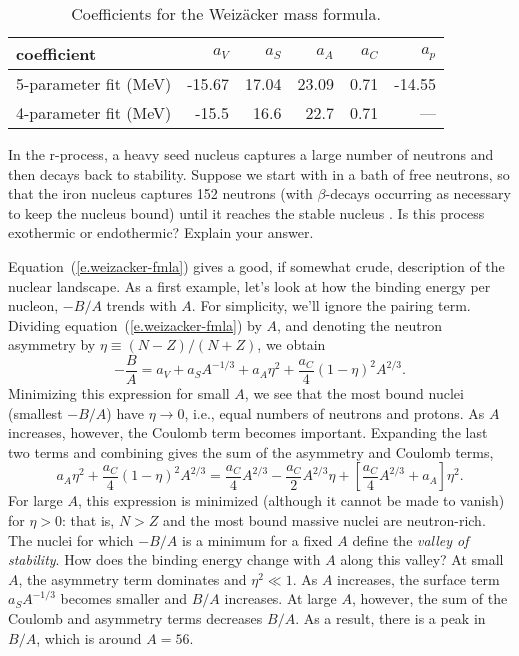 \begin{table}[htbp]
\caption{Coefficients for the Weiz\"acker mass formula.\label{t.liquid-drop-coefficients}}
\begin{center}
\begin{tabular}{l|rrrrr}
\hline
coefficient & $a_{V}$ & $a_{S}$ & $a_{A}$ & $a_{C}$ & $a_{p}$ \\
\hline\hline
5-parameter fit (MeV) & -15.67 & 17.04 & 23.09 & 0.71 & -14.55\\
4-parameter fit (MeV) & -15.5  &  16.6 & 22.7 & 0.71 & --- \\
\hline
\end{tabular}
\end{center}
\end{table}

\begin{exercisebox}
In the r-process, a heavy seed nucleus captures a large number of neutrons and then decays back to stability.  Suppose we start with \iron[56] in a bath of free neutrons, so that the iron nucleus captures 152 neutrons (with $\beta$-decays occurring as necessary to keep the nucleus bound) until it reaches the stable nucleus \lead[208].  Is this process exothermic or endothermic? Explain your answer.
\end{exercisebox}

Equation~(\ref{e.weizacker-fmla}) gives a good, if somewhat crude, description of the nuclear landscape.  As a first example,  let's look at how the binding energy per nucleon, $-B/A$ trends with $A$.  For simplicity, we'll ignore the pairing term. Dividing equation~(\ref{e.weizacker-fmla}) by $A$, and denoting the neutron asymmetry by $\eta \equiv (N-Z)/(N+Z)$, we obtain
\begin{equation}\label{e.binding-energy-per-nucleon}
 -\frac{B}{A} = a_{V} + a_{S} A^{-1/3} + a_{A}\eta^{2} + \frac{a_{C}}{4} \left( 1-\eta\right)^{2} A^{2/3}.
\end{equation}
Minimizing this expression for small $A$, we see that the most bound nuclei (smallest $-B/A$) have $\eta \to 0$, i.e., equal numbers of neutrons and protons.  As $A$ increases, however, the Coulomb term becomes important.  Expanding the last two terms and combining gives the sum of the asymmetry and Coulomb terms,
\[ a_{A}\eta^{2} + \frac{a_{C}}{4} \left( 1-\eta\right)^{2} A^{2/3} = \frac{a_{C}}{4} A^{2/3} - \frac{a_{C}}{2}A^{2/3}\eta + \left[ \frac{a_{C}}{4}A^{2/3} + a_{A} \right] \eta^{2} .\]
For large $A$, this expression is minimized (although it cannot be made to vanish) for $\eta > 0$: that is, $N>Z$ and the most bound massive nuclei are neutron-rich. The nuclei for which $-B/A$ is a minimum for a fixed $A$ define the \emph{valley of stability}. How does the binding energy change with $A$ along this valley?  At small $A$, the asymmetry term dominates and $\eta^{2}\ll 1$.  As $A$ increases, the surface term $a_{S}A^{-1/3}$ becomes smaller and $B/A$ increases.  At large $A$, however, the sum of the Coulomb and asymmetry terms decreases $B/A$.  As a result, there is a peak in $B/A$, which is around $A = 56$.

